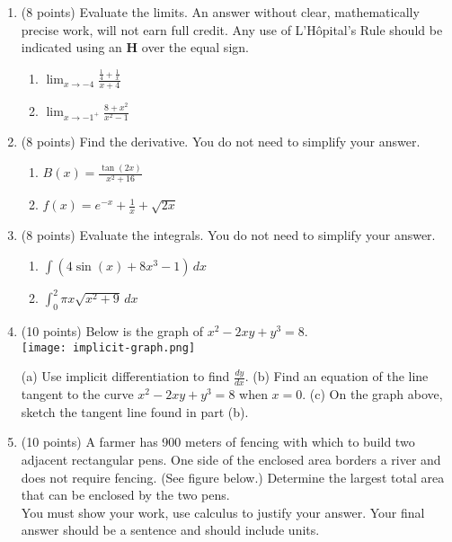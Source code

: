 \documentclass[12pt]{article}
\begin{document}
\newpage
\begin{enumerate}
\item (8 points) Evaluate the limits. An answer without clear, mathematically precise work, will not earn full credit. Any use of L'H\^{o}pital's Rule should be indicated using an \textbf{H} over the equal sign.
	\begin{enumerate}
	\item $\displaystyle \lim_{x \to -4} \frac{\frac{1}{4}+\frac{1}{x}}{x+4}$
	\vfill
	\item $\displaystyle \lim_{x \to -1^+} \frac{8+x^2}{x^2-1}$
	\vfill
	\end{enumerate}
\item (8 points) Find the derivative. You do not need to simplify your answer.
	\begin{enumerate}
	\item $\displaystyle B(x)=\frac{\tan(2x)}{{x^2+16}}$
	\vfill
	\item $\displaystyle f(x)=e^{-x}+\frac{1}{x}+\sqrt{2x}$
	\vfill
	\end{enumerate}
\newpage
\item (8 points) Evaluate the integrals. You do not need to simplify your answer.
\begin{enumerate}
	\item $\displaystyle \int (4\sin(x)+8x^3-1)\, dx$
	\vfill
	\item $\displaystyle \int_0^2 \pi x \sqrt{x^2+9} \, dx $
	\vfill
	\end{enumerate}
\newpage
\item (10 points) Below is the graph of $x^2-2xy+y^3=8.$\\
\texttt{[image: implicit-graph.png]}

(a) Use implicit differentiation to find $\displaystyle \frac{dy}{dx}.$
\vfill
(b) Find an equation of the line tangent to the curve $x^2-2xy+y^3=8$ when $x=0.$
\vfill
(c)  On the graph above, sketch the tangent line found in part (b).
\vspace{.5in}
\newpage
\item (10 points) A farmer has 900 meters of fencing with which to build two adjacent rectangular pens. One side of the enclosed area borders a river and does not require fencing. (See figure below.) Determine the largest total area that can be enclosed by the two pens.\\
You must show your work, use calculus to justify your answer. Your final answer should be a sentence and should include units.\\


\end{enumerate}
\end{document}
